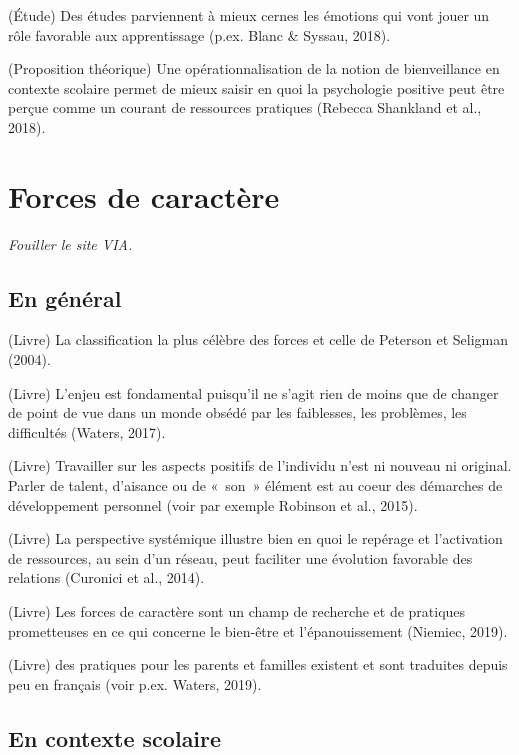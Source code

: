 \documentclass[
  french,
]{article}
\begin{document}
(Étude) Des études parviennent à mieux cernes les émotions qui vont jouer un rôle favorable aux apprentissage (p.ex. Blanc \& Syssau, 2018).

(Proposition théorique) Une opérationnalisation de la notion de bienveillance en contexte scolaire permet de mieux saisir en quoi la psychologie positive peut être perçue comme un courant de ressources pratiques (Rebecca Shankland et al., 2018).

\hypertarget{forces-de-caractuxe8re}{%
\section{Forces de caractère}\label{forces-de-caractuxe8re}}

\emph{Fouiller le site VIA.}

\hypertarget{en-guxe9nuxe9ral}{%
\subsection{En général}\label{en-guxe9nuxe9ral}}

(Livre) La classification la plus célèbre des forces et celle de Peterson et Seligman (2004).

(Livre) L'enjeu est fondamental puisqu'il ne s'agit rien de moins que de changer de point de vue dans un monde obsédé par les faiblesses, les problèmes, les difficultés (Waters, 2017).

(Livre) Travailler sur les aspects positifs de l'individu n'est ni nouveau ni original. Parler de talent, d'aisance ou de «~son~» élément est au coeur des démarches de développement personnel (voir par exemple Robinson et al., 2015).

(Livre) La perspective systémique illustre bien en quoi le repérage et l'activation de ressources, au sein d'un réseau, peut faciliter une évolution favorable des relations (Curonici et al., 2014).

(Livre) Les forces de caractère sont un champ de recherche et de pratiques prometteuses en ce qui concerne le bien-être et l'épanouissement (Niemiec, 2019).

(Livre) des pratiques pour les parents et familles existent et sont traduites depuis peu en français (voir p.ex. Waters, 2019).

\hypertarget{en-contexte-scolaire}{%
\subsection{En contexte scolaire}\label{en-contexte-scolaire}}
\end{document}
